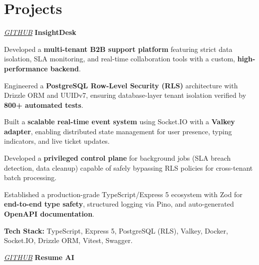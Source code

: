 \section{Projects}

    \begin{twocolentry}{
    \textit{\href{https://github.com/ehsan18t/insight-desk}{GITHUB}}}
        \textbf{InsightDesk}
    \end{twocolentry}

    \begin{onecolentry}
        \begin{highlights}
            \item Developed a \textbf{multi-tenant B2B support platform} featuring strict data isolation, SLA monitoring, and real-time collaboration tools with a custom, \textbf{high-performance backend}.
            \item Engineered a \textbf{PostgreSQL Row-Level Security (RLS)} architecture with Drizzle ORM and UUIDv7, ensuring database-layer tenant isolation verified by \textbf{800+ automated tests}.
            \item Built a \textbf{scalable real-time event system} using Socket.IO with a \textbf{Valkey adapter}, enabling distributed state management for user presence, typing indicators, and live ticket updates.
            \item Developed a \textbf{privileged control plane} for background jobs (SLA breach detection, data cleanup) capable of safely bypassing RLS policies for cross-tenant batch processing.
            \item Established a production-grade TypeScript/Express 5 ecosystem with Zod for \textbf{end-to-end type safety}, structured logging via Pino, and auto-generated \textbf{OpenAPI documentation}.
            \item \textbf{Tech Stack:} TypeScript, Express 5, PostgreSQL (RLS), Valkey, Docker, Socket.IO, Drizzle ORM, Vitest, Swagger.
        \end{highlights}
    \end{onecolentry}
    \vspace{0.3 cm}

    \begin{twocolentry}{
    \textit{\href{https://github.com/ehsan18t/resume-ai}{GITHUB}}}
        \textbf{Resume AI}
    \end{twocolentry}

